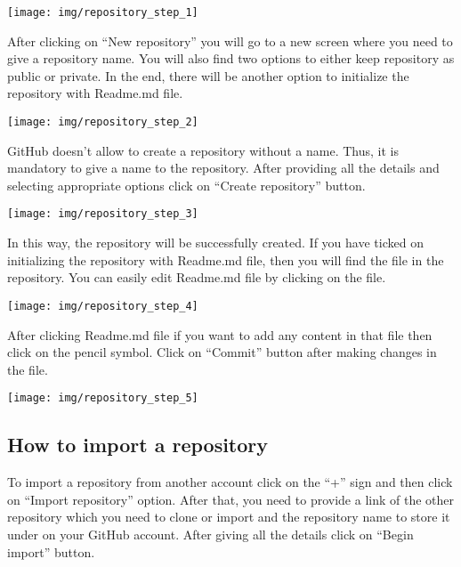 \documentclass[
]{book}
\begin{document}
\begin{center}\texttt{[image: img/repository\_step\_1]} \end{center}

After clicking on ``New repository'' you will go to a new screen where you need to give a repository name. You will also find two options to either keep repository as public or private. In the end, there will be another option to initialize the repository with Readme.md file.

\begin{center}\texttt{[image: img/repository\_step\_2]} \end{center}

GitHub doesn't allow to create a repository without a name. Thus, it is mandatory to give a name to the repository. After providing all the details and selecting appropriate options click on ``Create repository'' button.

\begin{center}\texttt{[image: img/repository\_step\_3]} \end{center}

In this way, the repository will be successfully created. If you have ticked on initializing the repository with Readme.md file, then you will find the file in the repository. You can easily edit Readme.md file by clicking on the file.

\begin{center}\texttt{[image: img/repository\_step\_4]} \end{center}

After clicking Readme.md file if you want to add any content in that file then click on the pencil symbol. Click on ``Commit'' button after making changes in the file.

\begin{center}\texttt{[image: img/repository\_step\_5]} \end{center}

\hypertarget{how-to-import-a-repository}{%
\subsection{How to import a repository}\label{how-to-import-a-repository}}

To import a repository from another account click on the ``+'' sign and then click on ``Import repository'' option. After that, you need to provide a link of the other repository which you need to clone or import and the repository name to store it under on your GitHub account. After giving all the details click on ``Begin import'' button.
\end{document}
